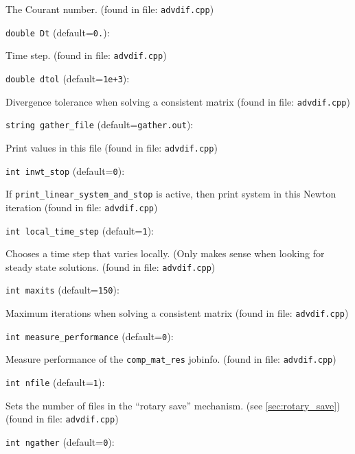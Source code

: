 The Courant number.
 (found in file: \verb+advdif.cpp+)
\item\verb+double Dt+ {\rm(default=\verb|0.|)}:

Time step. 
 (found in file: \verb+advdif.cpp+)
\item\verb+double dtol+ {\rm(default=\verb|1e+3|)}:

Divergence tolerance when solving a consistent matrix
 (found in file: \verb+advdif.cpp+)
\item\verb+string gather_file+ {\rm(default=\verb|gather.out|)}:

Print values in this file 
 (found in file: \verb+advdif.cpp+)
\item\verb+int inwt_stop+ {\rm(default=\verb|0|)}:

If \verb+print_linear_system_and_stop+ is active,
then print system in this Newton iteration 
 (found in file: \verb+advdif.cpp+)
\item\verb+int local_time_step+ {\rm(default=\verb|1|)}:

Chooses a time step that varies locally. (Only makes sense
when looking for steady state solutions. 
 (found in file: \verb+advdif.cpp+)
\item\verb+int maxits+ {\rm(default=\verb|150|)}:

Maximum iterations when solving a consistent matrix
 (found in file: \verb+advdif.cpp+)
\item\verb+int measure_performance+ {\rm(default=\verb|0|)}:

Measure performance of the  \verb+comp_mat_res+  jobinfo. 
 (found in file: \verb+advdif.cpp+)
\item\verb+int nfile+ {\rm(default=\verb|1|)}:

Sets the number of files in the ``rotary save'' mechanism. 
(see \ref{sec:rotary_save})
 (found in file: \verb+advdif.cpp+)
\item\verb+int ngather+ {\rm(default=\verb|0|)}:


